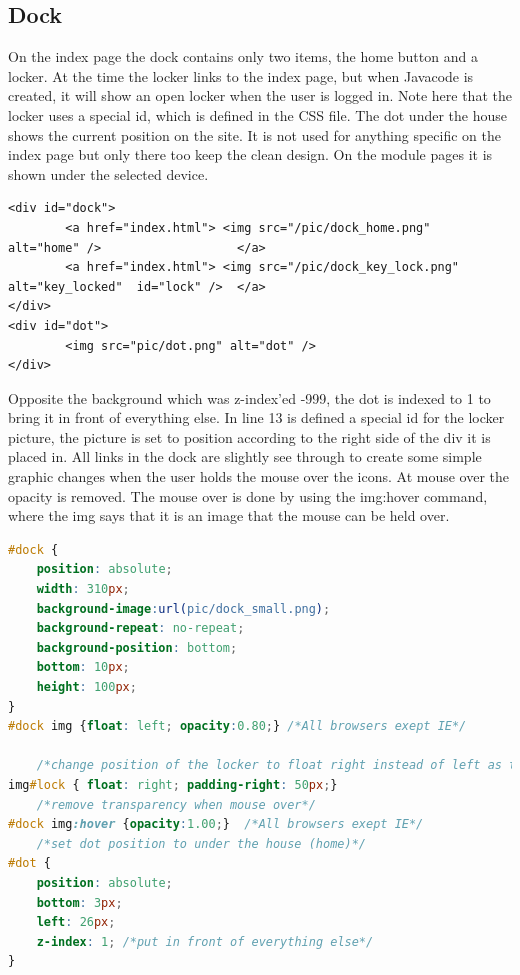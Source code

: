 \subsection{Dock}
On the index page the dock contains only two items, the home button and a locker. At the time the locker links to the index page, but when Javacode is created, it will show an open locker when the user is logged in. Note here that the locker uses a special id, which is defined in the CSS file. The dot under the house shows the current position on the site. It is not used for anything specific on the index page but only there too keep the clean design. On the module pages it is shown under the selected device.
\begin{lstlisting}
<div id="dock">
		<a href="index.html"> <img src="/pic/dock_home.png" 		alt="home" /> 					</a>
		<a href="index.html"> <img src="/pic/dock_key_lock.png" 	alt="key_locked"  id="lock" /> 	</a>
</div>
<div id="dot">
		<img src="pic/dot.png" alt="dot" />
</div>
\end{lstlisting}
Opposite the background which was z-index'ed -999, the dot is indexed to 1 to bring it in front of everything else. In line 13 is defined a special id for the locker picture, the picture is set to position according to the right side of the div it is placed in. All links in the dock are slightly see through to create some simple graphic changes when the user holds the mouse over the icons. At mouse over the opacity is removed. The mouse over is done by using the img:hover command, where the img says that it is an image that the mouse can be held over.
\begin{lstlisting}[language=CSS]
#dock {
	position: absolute;
	width: 310px;
	background-image:url(pic/dock_small.png);
	background-repeat: no-repeat;
	background-position: bottom;
	bottom: 10px;
	height: 100px;
}
#dock img {float: left; opacity:0.80;} /*All browsers exept IE*/

	/*change position of the locker to float right instead of left as the other link(s)*/
img#lock { float: right; padding-right: 50px;}
	/*remove transparency when mouse over*/
#dock img:hover {opacity:1.00;}  /*All browsers exept IE*/
	/*set dot position to under the house (home)*/
#dot {
	position: absolute;
	bottom: 3px;
	left: 26px;
	z-index: 1; /*put in front of everything else*/
}
\end{lstlisting}
